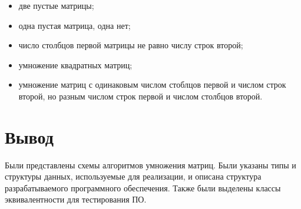 \begin{itemize}
	\item две пустые матрицы;
	\item одна пустая матрица, одна нет;
	\item число столбцов первой матрицы не равно числу строк второй;
	\item умножение квадратных матриц;
	\item умножение матриц с одинаковым числом стоблцов первой и числом строк второй, но разным числом строк первой и числом столбцов второй.
\end{itemize}

\section{Вывод}

Были представлены схемы алгоритмов умножения матриц. Были указаны типы и структуры данных, используемые для реализации, и описана структура разрабатываемого программного обеспечения. Также были выделены классы эквивалентности для тестирования ПО.
